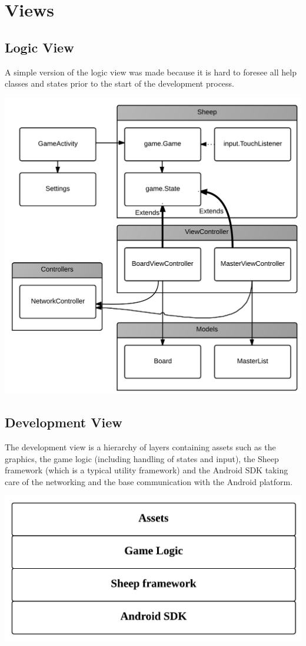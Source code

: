 \section{Views}
\label{sec:views}

\subsection{Logic View}
A simple version of the logic view was made because it is hard to foresee all
help classes and states prior to the start of the development process.
\begin{center}
\includegraphics[clip=true, width=0.9 \textwidth]{assets/LogicView.png}
\label{ref:gantt}
\end{center}

\subsection{Development View}
The development view is a hierarchy of layers containing assets such as the
graphics, the game logic (including handling of states and input), the Sheep
framework (which is a typical utility framework) and the Android SDK taking care
of the networking and the base communication with the Android platform.
\begin{center}
\includegraphics[clip=true, width=0.9 \textwidth]{assets/DevelopmentView.png}
\label{ref:gantt}
\end{center}

